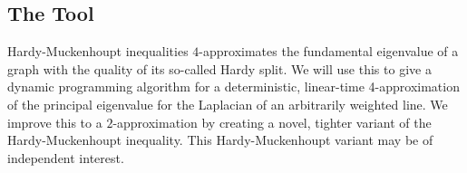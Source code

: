 \subsection{The Tool}
  Hardy-Muckenhoupt inequalities $4$-approximates the fundamental eigenvalue of a graph with
  the quality of its so-called Hardy split. We will use this to give a
  dynamic programming algorithm for a
  deterministic, linear-time 4-approximation of the principal eigenvalue
  for the Laplacian of an arbitrarily weighted line.  We improve this to
  a $2$-approximation by creating a novel, tighter variant of the
  Hardy-Muckenhoupt inequality.  This Hardy-Muckenhoupt variant may be
  of independent interest.
\fi
